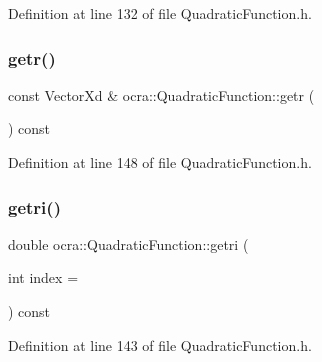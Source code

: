 Definition at line 132 of file Quadratic\+Function.\+h.

\hypertarget{classocra_1_1QuadraticFunction_a5e5e98d00ae2c3249954d6a9a262686f}{}\label{classocra_1_1QuadraticFunction_a5e5e98d00ae2c3249954d6a9a262686f} 
\subsubsection{\texorpdfstring{getr()}{getr()}}
{\footnotesize\ttfamily const Vector\+Xd \& ocra\+::\+Quadratic\+Function\+::getr (\begin{DoxyParamCaption}{ }\end{DoxyParamCaption}) const\hspace{0.3cm}{\ttfamily [inline]}}



Definition at line 148 of file Quadratic\+Function.\+h.

\hypertarget{classocra_1_1QuadraticFunction_a5b3500ab19d92999b51de585b73cbf58}{}\label{classocra_1_1QuadraticFunction_a5b3500ab19d92999b51de585b73cbf58} 
\subsubsection{\texorpdfstring{getri()}{getri()}}
{\footnotesize\ttfamily double ocra\+::\+Quadratic\+Function\+::getri (\begin{DoxyParamCaption}\item[{int}]{index = {} }\end{DoxyParamCaption}) const\hspace{0.3cm}{\ttfamily [inline]}}



Definition at line 143 of file Quadratic\+Function.\+h.

\hypertarget{classocra_1_1QuadraticFunction_ab42b63fecbd39d330f7ec7b13e5c3701}{}\label{classocra_1_1QuadraticFunction_ab42b63fecbd39d330f7ec7b13e5c3701} 

